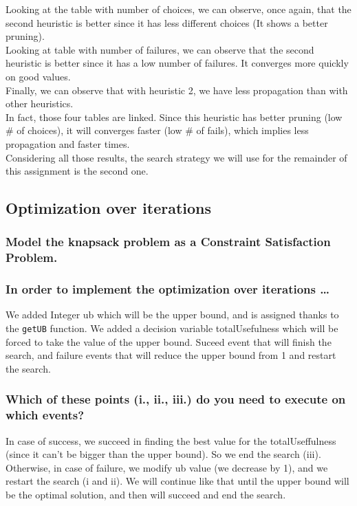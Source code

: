 \documentclass[a4paper ,12pt,french]{article}
\begin{document}
Looking at the table with number of choices, we can observe, once again, that the second heuristic is better since it has less different choices (It shows a better pruning).\\

Looking at table with number of failures, we can observe that the second heuristic is better since it has a low number of failures. It converges more quickly on good values.\\

Finally, we can observe that with heuristic 2, we have less propagation than with other heuristics.\\

In fact, those four tables are linked. Since this heuristic has better pruning (low \# of choices), it will converges faster (low \# of fails), which implies less propagation and faster times.\\

Considering all those results, the search strategy we will use for the remainder of this assignment is the second one.

\subsection{Optimization over iterations}

\subsubsection{Model the knapsack problem as a Constraint Satisfaction Problem.}



\subsubsection{In order to implement the optimization over iterations \dots}

We added Integer ub which will be the upper bound, and is assigned thanks to the \texttt{getUB} function. We added a decision variable totalUsefulness which will be forced to take the value of the upper bound. Suceed event that will finish the search, and failure events that will reduce the upper bound from 1 and restart the search.

\subsubsection{Which of these points (i., ii., iii.) do you need to execute on which events?}
In case of success, we succeed in finding the best value for the totalUseffulness (since it can't be bigger than the upper bound). So we end the search (iii). Otherwise, in case of failure, we modify ub value (we decrease by 1), and we restart the search (i and ii).
We will continue like that until the upper bound will be the optimal solution, and then will succeed and end the search.
\end{document}

